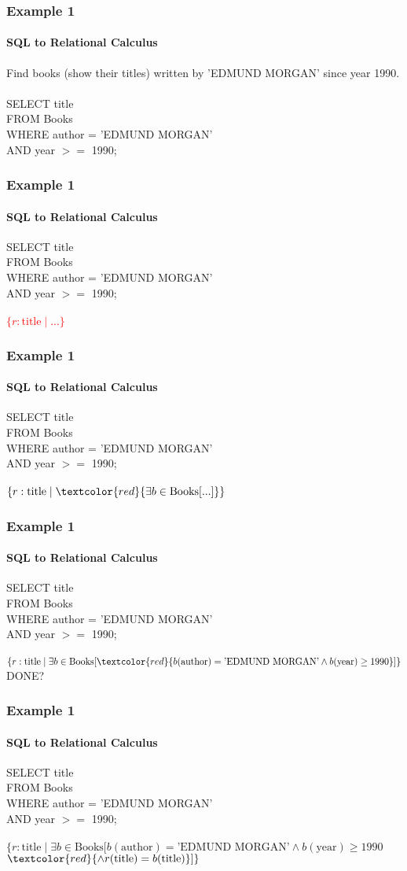 \documentclass{beamer}
\begin{document}
\begin{frame}
  \frametitle{Example 1}
    \framesubtitle{SQL to Relational Calculus}
  Find books (show their titles) written by 'EDMUND MORGAN' since year 1990.\\
  \hfill \\  
  SELECT title\\
  FROM Books\\
  WHERE author = 'EDMUND MORGAN'\\
  AND year $>=$ 1990;\\
\end{frame}

\begin{frame}
  \frametitle{Example 1}
    \framesubtitle{SQL to Relational Calculus}
  SELECT title\\
  FROM Books\\
  WHERE author = 'EDMUND MORGAN'\\
  AND year $>=$ 1990;\\
  \hfill \\
  \textcolor{red}{$\{r:\text{title} \mid ... \}$}
\end{frame}

\begin{frame}
  \frametitle{Example 1}
    \framesubtitle{SQL to Relational Calculus}
  SELECT title\\
  FROM Books\\
  WHERE author = 'EDMUND MORGAN'\\
  AND year $>=$ 1990;\\
  \hfill \\
  $\{r:\text{title} \mid \textcolor{red}{\exists b \in \text{Books} [ ... ]} \}$
\end{frame}

\begin{frame}
  \frametitle{Example 1}
    \framesubtitle{SQL to Relational Calculus}
  SELECT title\\
  FROM Books\\
  WHERE author = 'EDMUND MORGAN'\\
  AND year $>=$ 1990;\\
  \hfill \\
  $\{r:\text{title} \mid \exists b \in \text{Books} [ \textcolor{red}{b(\text{author}) = \text{'EDMUND MORGAN'} \land b(\text{year}) \geq 1990} ] \}$\\
  DONE?
\end{frame}

\begin{frame}
  \frametitle{Example 1}
    \framesubtitle{SQL to Relational Calculus}
  SELECT title\\
  FROM Books\\
  WHERE author = 'EDMUND MORGAN'\\
  AND year $>=$ 1990;\\
  \hfill \\
  $\{r:\text{title} \mid \exists b \in \text{Books} [ b(\text{author}) = \text{'EDMUND MORGAN'} \land b(\text{year}) \geq 1990$\\
  $\textcolor{red}{\land r(\text{title}) = b(\text{title})}] \}$\\
\end{frame}
\end{document}
